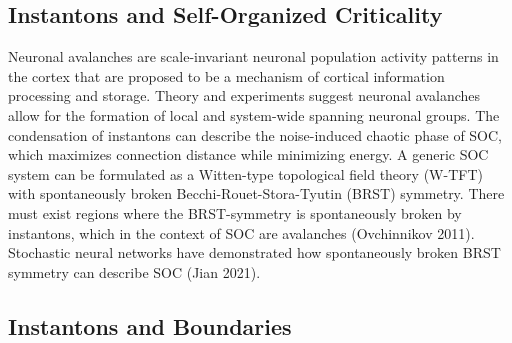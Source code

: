\documentclass{article}
\begin{document}
\subsection{Instantons and Self-Organized Criticality}
    Neuronal avalanches are scale-invariant neuronal population activity patterns in the cortex that are proposed to be a mechanism of cortical information processing and storage. Theory and experiments suggest neuronal avalanches allow for the formation of local and system-wide spanning neuronal groups. The condensation of instantons can describe the noise-induced chaotic phase of SOC, which maximizes connection distance while minimizing energy. A generic SOC system can be formulated as a Witten-type topological field theory (W-TFT) with spontaneously broken Becchi-Rouet-Stora-Tyutin (BRST) symmetry. There must exist regions where the BRST-symmetry is spontaneously broken by instantons, which in the context of SOC are avalanches (Ovchinnikov 2011). Stochastic neural networks have demonstrated how spontaneously broken BRST symmetry can describe SOC (Jian 2021). 
    



    
    \subsection{Instantons and Boundaries}
    
\end{document}
